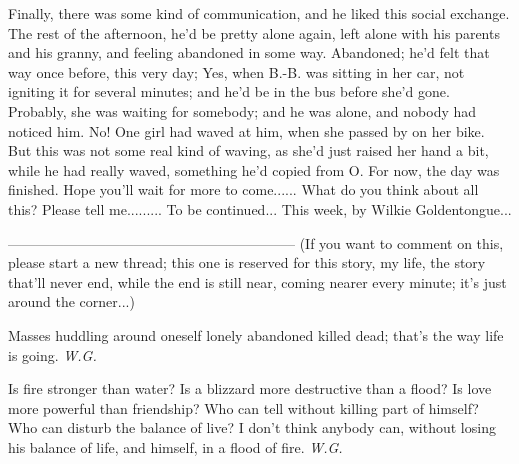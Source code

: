 Finally, there was some kind of communication, and he liked this social exchange. 
The rest of the afternoon, he'd be pretty alone again, left alone with his parents and his granny, and feeling abandoned in some way. 
Abandoned; he'd felt that way once before, this very day; Yes, when B.-B. was sitting in her car, not igniting it for several minutes; and he'd be in the bus before she'd gone. Probably, she was waiting for somebody; and he was alone, and nobody had noticed him. 
No! One girl had waved at him, when she passed by on her bike. But this was not some real kind of waving, as she'd just raised her hand a bit, while he had really waved, something he'd copied from O. 
For now, the day was finished. 
Hope you'll wait for more to come......
What do you think about all this? Please tell me.........
To be continued...
This week, by Wilkie Goldentongue...

--------------------------------------------------------------
(If you want to comment on this, please start a new thread; this one is reserved for this story, my life, the story that'll never end, while the end is still near, coming nearer every minute; it's just around the corner...)

Masses huddling around oneself 
    lonely      abandoned 
          killed 
           dead; 
that's the way life is going. 
\emph{W.G.}

Is fire 
stronger than water? 
Is a blizzard 
more destructive than a flood? 
Is love 
more powerful than friendship? 
Who can tell 
without killing part of himself? 
Who can disturb the balance of live? 
I don't think anybody can, 
without losing his balance of life, 
and himself, 
in a flood of fire. 
\emph{W.G.}
